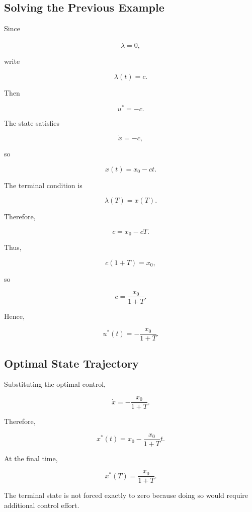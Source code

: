 \subsection{Solving the Previous Example}
\label{subsec:solving-quadratic-control-example}

Since

\[
\dot{\lambda}=0,
\]

write

\[
\lambda(t)=c.
\]

Then

\[
u^*=-c.
\]

The state satisfies

\[
\dot{x}=-c,
\]

so

\[
x(t)
=
x_0-ct.
\]

The terminal condition is

\[
\lambda(T)
=
x(T).
\]

Therefore,

\[
c
=
x_0-cT.
\]

Thus,

\[
c(1+T)
=
x_0,
\]

so

\[
\boxed{
c
=
\frac{x_0}{1+T}.
}
\]

Hence,

\[
\boxed{
u^*(t)
=
-
\frac{x_0}{1+T}.
}
\]

\subsection{Optimal State Trajectory}
\label{subsec:optimal-state-trajectory-example}

Substituting the optimal control,

\[
\dot{x}
=
-
\frac{x_0}{1+T}.
\]

Therefore,

\[
\boxed{
x^*(t)
=
x_0
-
\frac{x_0}{1+T}t.
}
\]

At the final time,

\[
\boxed{
x^*(T)
=
\frac{x_0}{1+T}.
}
\]

The terminal state is not forced exactly to zero because doing so would
require additional control effort.


